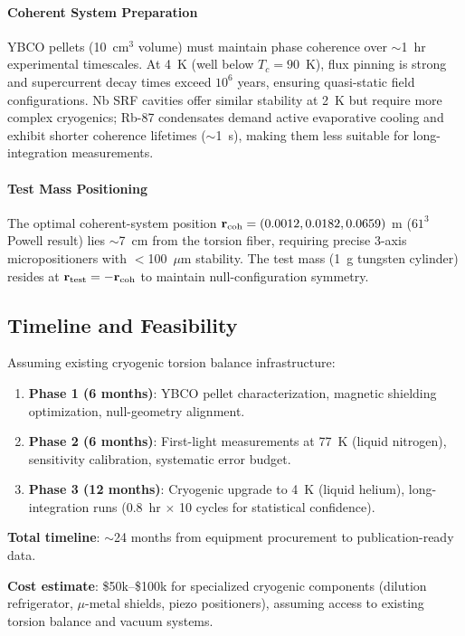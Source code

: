 \documentclass[10pt,twocolumn]{article}
\begin{document}
\paragraph{Coherent System Preparation}
YBCO pellets (10~cm$^3$ volume) must maintain phase coherence over $\sim$1~hr experimental timescales. At 4~K (well below $T_c = 90$~K), flux pinning is strong and supercurrent decay times exceed $10^6$ years, ensuring quasi-static field configurations. Nb SRF cavities offer similar stability at 2~K but require more complex cryogenics; Rb-87 condensates demand active evaporative cooling and exhibit shorter coherence lifetimes ($\sim$1~s), making them less suitable for long-integration measurements.

\paragraph{Test Mass Positioning}
The optimal coherent-system position ${\bf r}_{\text{coh}} = (0.0012, 0.0182, 0.0659)$ m ($61^3$ Powell result) lies $\sim$7~cm from the torsion fiber, requiring precise 3-axis micropositioners with $<$100~$\mu$m stability. The test mass (1~g tungsten cylinder) resides at ${\bf r}_{\text{test}} = -{\bf r}_{\text{coh}}$ to maintain null-configuration symmetry.

\subsection{Timeline and Feasibility}

Assuming existing cryogenic torsion balance infrastructure:

\begin{enumerate}
\item \textbf{Phase 1 (6 months)}: YBCO pellet characterization, magnetic shielding optimization, null-geometry alignment.
\item \textbf{Phase 2 (6 months)}: First-light measurements at 77~K (liquid nitrogen), sensitivity calibration, systematic error budget.
\item \textbf{Phase 3 (12 months)}: Cryogenic upgrade to 4~K (liquid helium), long-integration runs (0.8~hr $\times$ 10 cycles for statistical confidence).
\end{enumerate}

\textbf{Total timeline}: $\sim$24 months from equipment procurement to publication-ready data.

\textbf{Cost estimate}: \$50k--\$100k for specialized cryogenic components (dilution refrigerator, $\mu$-metal shields, piezo positioners), assuming access to existing torsion balance and vacuum systems.
\end{document}
